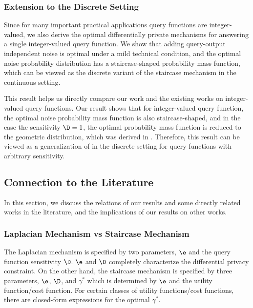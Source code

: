 \subsubsection{Extension to the Discrete Setting}

Since for many important practical applications query functions are integer-valued, we also derive the optimal differentially private mechanisms for answering a single integer-valued query function.
 We show that adding query-output independent noise is optimal under a mild technical condition, and the optimal noise probability distribution has a staircase-shaped probability mass function, which can be viewed as the discrete variant of the staircase mechanism in the continuous setting.

 This result helps us directly compare our work and the existing works \cite{Ghosh09, minimax10} on integer-valued query functions. Our result shows that for integer-valued query function, the optimal noise probability mass function is also  staircase-shaped, and in the case the sensitivity $\D = 1$, the optimal probability mass function is reduced to the geometric distribution, which was derived in \cite{Ghosh09, minimax10}. Therefore, this result can be viewed as a generalization of \cite{Ghosh09, minimax10} in the discrete setting for query functions with arbitrary sensitivity.













\subsection{Connection to the Literature}\label{subsec:connection}

In this section, we discuss the relations of our results and some directly related works in the literature, and the implications of our results on  other works.

\subsubsection{Laplacian Mechanism vs Staircase Mechanism}



The Laplacian mechanism is specified by two parameters, $\e$ and the query function sensitivity $\D$. $\e$ and $\D$ completely characterize the  differential privacy constraint. On the other hand, the staircase mechanism is specified by three parameters, $\e$, $\D$, and $\gamma^*$ which is determined by $\e$ and the utility function/cost function. For certain classes of utility functions/cost  functions, there are closed-form expressions for the optimal $\gamma^*$.

